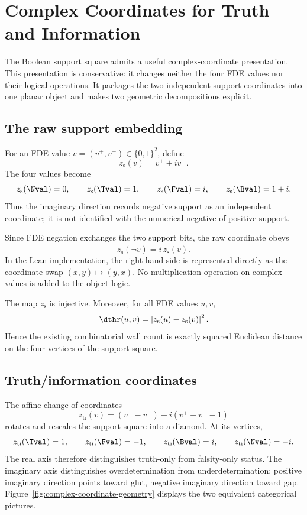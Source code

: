 \section{Complex Coordinates for Truth and Information}
\label{sec:complex-coordinates}

The Boolean support square admits a useful complex-coordinate presentation.
This presentation is conservative: it changes neither the four FDE values nor
their logical operations. It packages the two independent support coordinates
into one planar object and makes two geometric decompositions explicit.

\subsection{The raw support embedding}

For an FDE value \(v=(v^+,v^-)\in\{0,1\}^2\), define
\[
  z_{\mathrm{s}}(v)=v^+ + i v^-.
\]
The four values become
\[
  z_{\mathrm{s}}(\Nval)=0,\qquad
  z_{\mathrm{s}}(\Tval)=1,\qquad
  z_{\mathrm{s}}(\Fval)=i,\qquad
  z_{\mathrm{s}}(\Bval)=1+i.
\]
Thus the imaginary direction records negative support as an independent
coordinate; it is not identified with the numerical negative of positive
support.

Since FDE negation exchanges the two support bits, the raw coordinate obeys
\[
  z_{\mathrm{s}}(\neg v)=i\,\overline{z_{\mathrm{s}}(v)}.
\]
In the Lean implementation, the right-hand side is represented directly as
the coordinate swap \((x,y)\mapsto(y,x)\). No multiplication operation on
complex values is added to the object logic.

\begin{theorem}
The map \(z_{\mathrm{s}}\) is injective. Moreover, for all FDE values \(u,v\),
\[
  \dthr(u,v)=\left|z_{\mathrm{s}}(u)-z_{\mathrm{s}}(v)\right|^2.
\]
Hence the existing combinatorial wall count is exactly squared Euclidean
distance on the four vertices of the support square.
\statusverified
\end{theorem}

\subsection{Truth/information coordinates}

The affine change of coordinates
\[
  z_{\mathrm{ti}}(v)
  =(v^+-v^-)+i(v^++v^--1)
\]
rotates and rescales the support square into a diamond. At its vertices,
\[
  z_{\mathrm{ti}}(\Tval)=1,\qquad
  z_{\mathrm{ti}}(\Fval)=-1,\qquad
  z_{\mathrm{ti}}(\Bval)=i,\qquad
  z_{\mathrm{ti}}(\Nval)=-i.
\]
The real axis therefore distinguishes truth-only from falsity-only status. The
imaginary axis distinguishes overdetermination from underdetermination: positive
imaginary direction points toward glut, negative imaginary direction toward
gap. Figure~\ref{fig:complex-coordinate-geometry} displays the two equivalent
categorical pictures.

